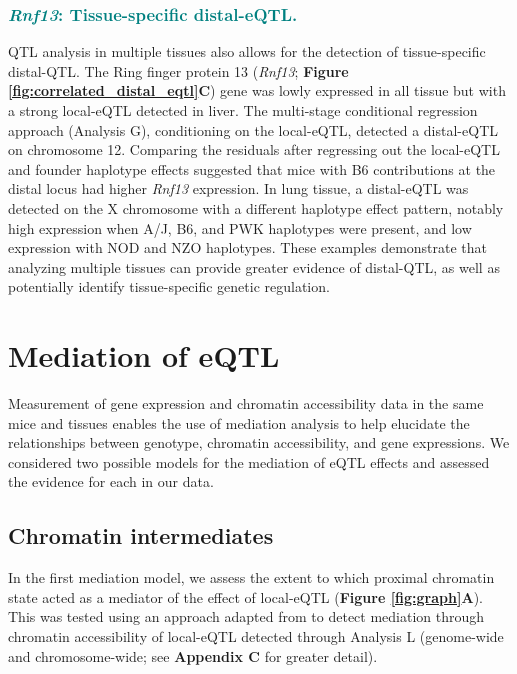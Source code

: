 \documentclass[9pt,twocolumn,twoside]{gsajnl}
\newcommand{\WVinline}[1]{\textcolor{red}{#1}}
\newcommand{\GKinline}[1]{\textcolor{teal}{#1}}
\begin{document}
\subsubsection{\GKinline{\textit{Rnf13}: Tissue-specific distal-eQTL.}}
QTL analysis in multiple tissues also allows for the detection of tissue-specific distal-QTL. The Ring finger protein 13 (\textit{Rnf13}; \textbf{Figure \ref{fig:correlated_distal_eqtl}C}) gene was lowly expressed in all tissue but with a strong local-eQTL detected in liver. The multi-stage conditional regression approach (Analysis G), conditioning on the local-eQTL, detected a distal-eQTL on chromosome 12. Comparing the residuals after regressing out the local-eQTL and founder haplotype effects suggested that mice with B6 contributions at the distal locus had higher \textit{Rnf13} expression. In lung tissue, a distal-eQTL was detected on the X chromosome with a different haplotype effect pattern, notably high expression when A/J, B6, and PWK haplotypes were present, and low expression with NOD and NZO haplotypes. These examples demonstrate that analyzing multiple tissues can provide greater evidence of distal-QTL, as well as potentially identify tissue-specific genetic regulation.

\section{Mediation of eQTL}

Measurement of gene expression and chromatin accessibility data in the same mice and tissues enables the use of mediation analysis to help elucidate the relationships between genotype, chromatin accessibility, and gene expressions. 
We considered two possible models for the mediation of eQTL effects and assessed the evidence for each in our data.


\subsection{Chromatin intermediates}

In the first mediation model, we assess the extent to which proximal chromatin state acted as a mediator of the effect of local-eQTL (\textbf{Figure \ref{fig:graph}A}). This was tested using an approach adapted from \cite{Chick2016} to detect mediation through chromatin accessibility of local-eQTL detected through Analysis L (genome-wide and chromosome-wide; see \textbf{Appendix C} for greater detail).  
\end{document}
